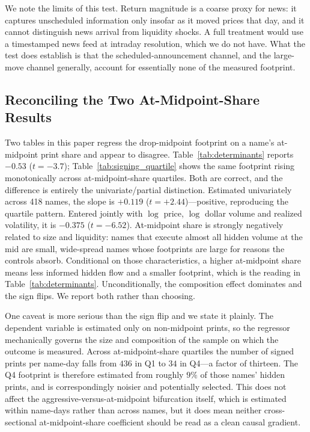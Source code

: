 \documentclass[11pt]{article}
\begin{document}
We note the limits of this test. Return magnitude is a coarse proxy for news: it captures
unscheduled information only insofar as it moved prices that day, and it cannot distinguish
news arrival from liquidity shocks. A full treatment would use a timestamped news feed at
intraday resolution, which we do not have. What the test does establish is that the
scheduled-announcement channel, and the large-move channel generally, account for
essentially none of the measured footprint.

\subsection{Reconciling the Two At-Midpoint-Share Results}
\label{sub:amid}

Two tables in this paper regress the drop-midpoint footprint on a name's at-midpoint print
share and appear to disagree. Table~\ref{tab:determinants} reports $-0.53$ ($t=-3.7$);
Table~\ref{tab:signing_quartile} shows the same footprint rising monotonically across
at-midpoint-share quartiles. Both are correct, and the difference is entirely the
univariate/partial distinction. Estimated univariately across 418 names, the slope is
$+0.119$ ($t=+2.44$)---positive, reproducing the quartile pattern. Entered jointly with
$\log$ price, $\log$ dollar volume and realized volatility, it is $-0.375$ ($t=-6.52$).
At-midpoint share is strongly negatively related to size and liquidity: names that execute
almost all hidden volume at the mid are small, wide-spread names whose footprints are large
for reasons the controls absorb. Conditional on those characteristics, a higher at-midpoint
share means less informed hidden flow and a smaller footprint, which is the reading in
Table~\ref{tab:determinants}. Unconditionally, the composition effect dominates and the
sign flips. We report both rather than choosing.

One caveat is more serious than the sign flip and we state it plainly. The dependent
variable is estimated only on non-midpoint prints, so the regressor mechanically governs
the size and composition of the sample on which the outcome is measured. Across
at-midpoint-share quartiles the number of signed prints per name-day falls from $436$ in
Q1 to $34$ in Q4---a factor of thirteen. The Q4 footprint is therefore estimated from
roughly $9\%$ of those names' hidden prints, and is correspondingly noisier and potentially
selected. This does not affect the aggressive-versus-at-midpoint bifurcation itself, which
is estimated within name-days rather than across names, but it does mean neither
cross-sectional at-midpoint-share coefficient should be read as a clean causal gradient.
\end{document}
